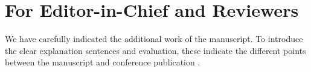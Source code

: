 \documentclass[11pt,a4paper]{article}
\begin{document}
\newpage

\section{For Editor-in-Chief and Reviewers}





\noindent
%
We have carefully indicated the additional work of the manuscript. To introduce
the clear explanation sentences and evaluation, these indicate the different
points between the manuscript and conference publication
\cite{kuzuno22iwsec}.%

%
%
\end{document}
